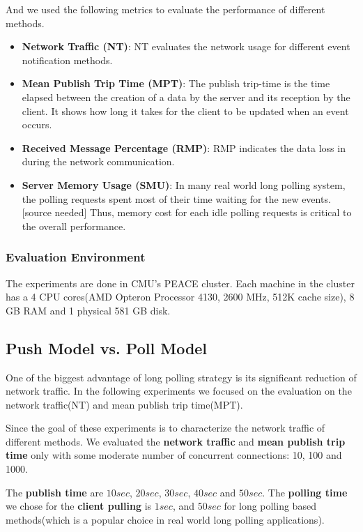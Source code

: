 And we used the following metrics to evaluate the performance of different
methods.
\begin{itemize}
    \item {\bf Network Traffic (NT)}: NT evaluates the network usage for
        different event notification methods.
    \item {\bf Mean Publish Trip Time (MPT)}: The publish trip-time is 
        the time elapsed between the creation of a data by the server and 
        its reception by the client. It shows how long it takes for the 
        client to be updated when an event occurs.
    \item {\bf Received Message Percentage (RMP)}: RMP indicates the data 
        loss in during the network communication. 
    \item {\bf Server Memory Usage (SMU)}: In many real world long polling 
        system, the polling requests spent most of their time waiting for 
        the new events.[source needed] Thus, memory cost for each idle 
        polling requests is critical to the overall performance.
\end{itemize}

\subsubsection{Evaluation Environment \\}
The experiments are done in CMU's PEACE cluster. Each machine in the cluster 
has a 4 CPU cores(AMD Opteron Processor 4130, 2600 MHz, 512K cache size),
8 GB RAM and 1 physical 581 GB disk.

\subsection{Push Model vs. Poll Model\\}

One of the biggest advantage of long polling strategy is its significant 
reduction of network traffic. In the following experiments we focused on
the evaluation on the network traffic(NT) and mean publish trip time(MPT).

Since the goal of these experiments is to characterize the network traffic 
of different methods. We evaluated the {\bf network traffic} and {\bf mean 
publish trip time} only with some moderate number of concurrent 
connections: 10, 100 and 1000. 

The {\bf publish time} are $10 sec$, $20 sec$, $30 sec$, $40 sec$ and 
$50 sec$. The {\bf polling time} we chose for the {\bf client pulling}
is $1 sec$, and $50 sec$ for long polling based methods(which is a 
popular choice in real world long polling applications).

